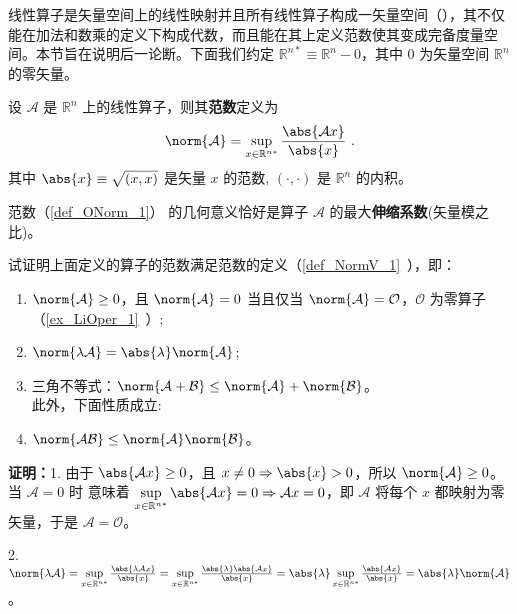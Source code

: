线性算子是矢量空间上的线性映射并且所有线性算子构成一矢量空间（），其不仅能在加法和数乘的定义下构成代数，而且能在其上定义范数使其变成完备度量空间。本节旨在说明后一论断。下面我们约定 $\mathbb R^{n*}\equiv\mathbb R^n-0$，其中 $0$ 为矢量空间 $\mathbb R^n$ 的零矢量。
\begin{definition}{}\label{def_ONorm_1}
设 $\mathcal A$ 是 $\mathbb R^n$ 上的线性算子，则其\textbf{范数}定义为
\begin{equation}\label{eq_ONorm_1}
\norm{\mathcal A}=\sup_{x\in{\mathbb R^{n*}}}\frac{\abs{\mathcal Ax}}{\abs{x}}~.
\end{equation}
其中 $\abs{x}\equiv\sqrt{(x,x)}$ 是矢量 $x$ 的范数, $(\cdot,\cdot)$ 是 $\mathbb R^n$ 的内积。
\end{definition}
范数（\autoref{def_ONorm_1}） 的几何意义恰好是算子 $\mathcal A$ 的最大\textbf{伸缩系数}(矢量模之比)。
\begin{example}{}
试证明上面定义的算子的范数满足范数的定义（\autoref{def_NormV_1}~），即：
\begin{enumerate}
\item $\norm{\mathcal A}\geq0$，且 $\norm{\mathcal A}=0$ 当且仅当 $\norm{\mathcal A}=\mathcal O$，$\mathcal O$ 为零算子（\autoref{ex_LiOper_1}~）;
\item $\norm{\lambda \mathcal A}=\abs{\lambda}\norm{\mathcal A}$;
\item 三角不等式：$\norm{\mathcal A+\mathcal B}\leq\norm{\mathcal A}+\norm{\mathcal B}$。\\
此外，下面性质成立:\\
\item $\norm{\mathcal{AB}}\leq{\norm{\mathcal A}}\norm{\mathcal B}$。
\end{enumerate}
\end{example}
\textbf{证明：}1. 由于 $\abs{\mathcal A x}\geq0$，且 $x\neq0\Rightarrow\abs{x}>0$，所以
$\norm{\mathcal A}\geq0$。当 $\mathcal A=0$ 时 意味着 $\sup\limits_{x\in{\mathbb R^{n*}}}\abs{\mathcal A x}=0\Rightarrow\mathcal A x=0$，即 $\mathcal A$ 将每个 $x$ 都映射为零矢量，于是 $\mathcal A=\mathcal O$。

2.$\norm{\lambda\mathcal A}=\sup\limits_{x\in{\mathbb R^{n*}}}\frac{\abs{\lambda \mathcal Ax}}{\abs{x}}=\sup\limits_{x\in{\mathbb R^{n*}}}\frac{\abs{\lambda}\abs{ \mathcal Ax}}{\abs{x}}=\abs{\lambda}\sup\limits_{x\in{\mathbb R^{n*}}}\frac{\abs{\mathcal Ax}}{\abs{x}}=\abs{\lambda}\norm{\mathcal A}
$。

